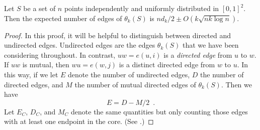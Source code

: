 \documentclass[twoside,leqno,twocolumn]{article}
\begin{document}
\begin{lem}
 Let $S$ be a set of $n$ points independently and uniformly distributed
 in $[0,1]^2$.  Then the expected number of edges of $\theta_k(S)$ is 
 $nd_k/2\pm O(k\sqrt{nk\log n})$.
\end{lem}

\begin{proof}
  In this proof, it will be helpful to distinguish between directed
  and undirected edges. Undirected edges are the edges $\theta_k(S)$
  that we have been considering throughout.  In contrast, $uw=e(u,i)$
  is a \emph{directed edge} from $u$ to $w$.  If $uw$ is mutual, then
  $wu=e(w,j)$ is a distinct directed edge from $w$ to $u$.  In this way,
  if we let $E$ denote the number of undirected edges, $D$ the number
  of directed edges, and $M$ the number of mutual directed edges of
  $\theta_k(S)$.   Then we have
  \[  
     E = D - M/2 \enspace . 
  \]
  Let $E_C$, $D_C$, and $M_C$ denote the same quantities but only
  counting those edges with at least one endpoint in the core. (See .)


\end{proof}
\end{document}
